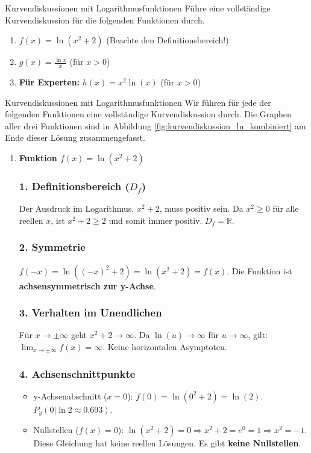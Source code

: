 \begin{aufgabenumgebung}{Kurvendiskussionen mit Logarithmusfunktionen}
Führe eine vollständige Kurvendiskussion für die folgenden Funktionen durch.
\begin{enumerate}
    \item $f(x) = \ln(x^2+2)$ (Beachte den Definitionsbereich!)
    \item $g(x) = \frac{\ln x}{x}$ (für $x>0$)
    \item \textbf{Für Experten:} $h(x) = x^2 \ln(x)$ (für $x>0$)
\end{enumerate}
\end{aufgabenumgebung}


\begin{loesungsumgebung}{Kurvendiskussionen mit Logarithmusfunktionen}
Wir führen für jede der folgenden Funktionen eine vollständige Kurvendiskussion durch. Die Graphen aller drei Funktionen sind in Abbildung \ref{fig:kurvendiskussion_ln_kombiniert} am Ende dieser Lösung zusammengefasst.

\begin{enumerate}[label=(\alph*)]
    \item \textbf{Funktion $f(x) = \ln(x^2+2)$}

    \subsubsection*{1. Definitionsbereich ($D_f$)}
    Der Ausdruck im Logarithmus, $x^2+2$, muss positiv sein. Da $x^2 \ge 0$ für alle reellen $x$, ist $x^2+2 \ge 2$ und somit immer positiv.
    $D_f = \mathbb{R}$.

    \subsubsection*{2. Symmetrie}
    $f(-x) = \ln((-x)^2+2) = \ln(x^2+2) = f(x)$.
    Die Funktion ist \textbf{achsensymmetrisch zur y-Achse}.

    \subsubsection*{3. Verhalten im Unendlichen}
    Für $x \to \pm\infty$ geht $x^2+2 \to \infty$. Da $\ln(u) \to \infty$ für $u \to \infty$, gilt:
    $\lim_{x \to \pm\infty} f(x) = \mathbf{\infty}$. Keine horizontalen Asymptoten.

    \subsubsection*{4. Achsenschnittpunkte}
    \begin{itemize}
        \item y-Achsenabschnitt ($x=0$): $f(0) = \ln(0^2+2) = \ln(2)$. $P_y(0|\ln 2 \approx 0.693)$.
        \item Nullstellen ($f(x)=0$): $\ln(x^2+2)=0 \Rightarrow x^2+2 = e^0 = 1 \Rightarrow x^2 = -1$.
        Diese Gleichung hat keine reellen Lösungen. Es gibt \textbf{keine Nullstellen}.
    \end{itemize}


\end{enumerate}
\end{loesungsumgebung}
